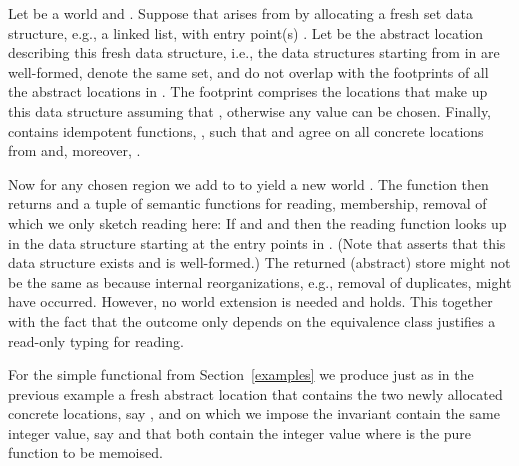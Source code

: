 \documentclass[orivec]{llncs}
\newif\iffull\fullfalse
\renewcommand{\paragraph}[1]{\noindent {\bf #1}}
\begin{document}
\paragraph{Set factory}
Let  be a world and . Suppose that 
arises from  by allocating a fresh set data structure, e.g., a
linked list, with entry point(s) . Let  be the abstract
location describing this fresh data structure, i.e.,
 the data structures starting from 
in  are well-formed, denote the same set, and do not
overlap with the footprints of all the abstract locations in . The
footprint  comprises the locations that make up this 
data structure assuming that , otherwise any
value can be chosen. Finally,  contains idempotent
functions, , such that 
and  agree on all concrete locations from
 and, moreover,
. 

Now for any chosen region  we add  to  to
yield a new world . The function 
then returns  and a tuple of semantic functions for reading,
membership, removal of which we only sketch reading here: If
 and  and
 then the reading function looks up  in the data
structure starting at the entry points  in . (Note that
 asserts that this data structure exists and is
well-formed.) The returned (abstract) store  might not be the
same as  because internal reorganizations, e.g., removal of
duplicates, might have occurred. However, no world extension is needed
and
 holds. This together with the fact that
the outcome only depends on the  equivalence class \iffull(in the
proof-relevant sense)\fi justifies a read-only typing for reading. 

\iffull
In order to model the object-oriented version with a basic type
 for each region , we can use the p.p.f.\
 and
 is of the above format and 
. Equality on  is discrete and one puts
. The indirection through  is
necessary so that we recognize that a given abstract location is
indeed a ``set''.
\fi
\paragraph{Memoization} For the simple  functional
from Section~\ref{examples} we produce just as in the previous example a
fresh
abstract location  that contains the two newly allocated
concrete locations, say , and on which we impose the
invariant 
 contain the same integer value, say 
and that  both contain the integer value
 where  is the pure function to be memoised.\iffull We see in
Lemma~\ref{lemmasix} that if a function is semantically pure (empty
effect) then there is a world- and store-independent function
describing its action.\fi
\end{document}

